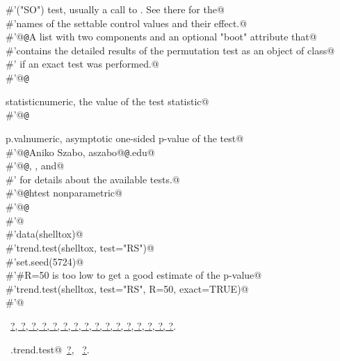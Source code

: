 \documentclass[reqno]{amsart}
\renewcommand{\NWlink}[2]{\hyperlink{#1}{#2}}
\begin{document}
\begin{flushleft}
\begin{list}{}{}
\mbox{}\verb@#'("SO") test, usually a call to .  See there for the@\\
\mbox{}\verb@#'names of the settable control values and their effect.@\\
\mbox{}\verb@#'@{\tt @}\verb@return A list with two components and an optional "boot" attribute that@\\
\mbox{}\verb@#'contains the detailed results of the permutation test as an object of class@\\
\mbox{}\verb@#' if an exact test was performed.@\\
\mbox{}\verb@#'@{\tt @}\verb@return \item{statistic}{numeric, the value of the test statistic}@\\
\mbox{}\verb@#'@{\tt @}\verb@return \item{p.val}{numeric, asymptotic one-sided p-value of the test}@\\
\mbox{}\verb@#'@{\tt @}\verb@author Aniko Szabo, aszabo@{\tt @}\verb@mcw.edu@\\
\mbox{}\verb@#'@{\tt @}\verb@seealso {}, , and@\\
\mbox{}\verb@#' for details about the available tests.@\\
\mbox{}\verb@#'@{\tt @}\verb@keywords htest nonparametric@\\
\mbox{}\verb@#'@{\tt @}\verb@examples@\\
\mbox{}\verb@#'@\\
\mbox{}\verb@#'data(shelltox)@\\
\mbox{}\verb@#'trend.test(shelltox, test="RS")@\\
\mbox{}\verb@#'set.seed(5724)@\\
\mbox{}\verb@#'#R=50 is too low to get a good estimate of the p-value@\\
\mbox{}\verb@#'trend.test(shelltox, test="RS", R=50, exact=TRUE)@\\
\mbox{}\verb@#'@\\
\mbox{}\verb@@{\NWsep}
\end{list}
\vspace{-1.5ex}
\footnotesize
\begin{list}{}{\setlength{\itemsep}{-\parsep}\setlength{\itemindent}{-\leftmargin}}
\item \NWtxtFileDefBy\ \NWlink{nuweb?}{?}\NWlink{nuweb?}{, ?}\NWlink{nuweb?}{, ?}\NWlink{nuweb?}{, ?}\NWlink{nuweb?}{, ?}\NWlink{nuweb?}{, ?}\NWlink{nuweb?}{, ?}\NWlink{nuweb?}{, ?}\NWlink{nuweb?}{, ?}\NWlink{nuweb?}{, ?}\NWlink{nuweb?}{, ?}\NWlink{nuweb?}{, ?}\NWlink{nuweb?}{, ?}\NWlink{nuweb?}{, ?}\NWlink{nuweb?}{, ?}\NWlink{nuweb?}{, ?}.
\item \NWtxtIdentsUsed\nobreak\  \verb@SO.trend.test@\nobreak\ \NWlink{nuweb?}{?}, \verb@soControl@\nobreak\ \NWlink{nuweb?}{?}.
\item{}
\end{list}
\vspace{4ex}
\end{flushleft}
\end{document}
